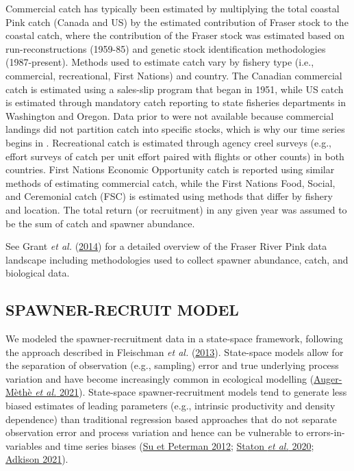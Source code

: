 \documentclass[french,11pt]{book}
\begin{document}
Commercial catch has typically been estimated by multiplying the total coastal Pink catch (Canada and US) by the estimated contribution of Fraser stock to the coastal catch, where the contribution of the Fraser stock was estimated based on run-reconstructions (1959-85) and genetic stock identification methodologies (1987-present). Methods used to estimate catch vary by fishery type (i.e., commercial, recreational, First Nations) and country. The Canadian commercial catch is estimated using a sales-slip program that began in 1951, while US catch is estimated through mandatory catch reporting to state fisheries departments in Washington and Oregon. Data prior to  were not available because commercial landings did not partition catch into specific stocks, which is why our time series begins in . Recreational catch is estimated through agency creel surveys (e.g., effort surveys of catch per unit effort paired with flights or other counts) in both countries. First Nations Economic Opportunity catch is reported using similar methods of estimating commercial catch, while the First Nations Food, Social, and Ceremonial catch (FSC) is estimated using methods that differ by fishery and location. The total return (or recruitment) in any given year was assumed to be the sum of catch and spawner abundance.

See Grant \emph{et al.} (\protect\hyperlink{ref-grantFraserRiverPink2014}{2014}) for a detailed overview of the Fraser River Pink data landscape including methodologies used to collect spawner abundance, catch, and biological data.

\hypertarget{spawner-recruit-model}{%
\subsection{SPAWNER-RECRUIT MODEL}\label{spawner-recruit-model}}

We modeled the spawner-recruitment data in a state-space framework, following the approach described in Fleischman \emph{et al.} (\protect\hyperlink{ref-fleischmanAgestructuredStatespaceStock2013}{2013}). State-space models allow for the separation of observation (e.g., sampling) error and true underlying process variation and have become increasingly common in ecological modelling (\protect\hyperlink{ref-auger-metheGuideStateSpace2021}{Auger-Mèthè \emph{et al.} 2021}). State-space spawner-recruitment models tend to generate less biased estimates of leading parameters (e.g., intrinsic productivity and density dependence) than traditional regression based approaches that do not separate observation error and process variation and hence can be vulnerable to errors-in-variables and time series biases (\protect\hyperlink{ref-suPerformanceBayesianStatespace2012}{Su et Peterman 2012}; \protect\hyperlink{ref-statonEvaluationMethodsSpawner2020}{Staton \emph{et al.} 2020}; \protect\hyperlink{ref-adkisonReviewSalmonSpawnerRecruitment2021}{Adkison 2021}).
\end{document}
